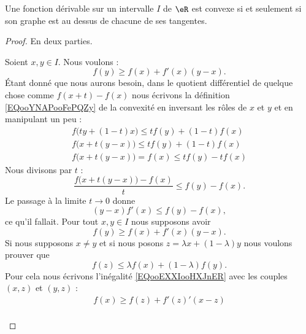 \begin{proposition} \label{PROPooQPOSooDZlUAJ}
	Une fonction dérivable sur un intervalle \( I\) de \( \eR\) est convexe si et seulement si son graphe est au dessus de chacune de ses tangentes.
\end{proposition}

\begin{proof}
	En deux parties.
	\begin{subproof}
		Soient \( x,y\in I\). Nous voulons :
		\begin{equation}
			f(y)\geq f(x)+f'(x)(y-x).
		\end{equation}
		Étant donné que nous aurons besoin, dans le quotient différentiel de quelque chose comme \( f(x+t)-f(x)\) nous écrivons la définition \eqref{EQooYNAPooFePQZy} de la convexité en inversant les rôles de \( x\) et \( y\) et en manipulant un peu :
		\begin{subequations}
			\begin{align}
				f\big( ty+(1-t)x \big)\leq tf(y)+(1-t)f(x) \\
				f\big( x+t(y-x) \big)\leq tf(y)+(1-t)f(x)  \\
				f\big(  x+t(y-x)  \big)=f(x)\leq tf(y)-tf(x)
			\end{align}
		\end{subequations}
		Nous divisons par \( t\) :
		\begin{equation}
			\frac{ f\big( x+t(y-x) \big)-f(x) }{ t }\leq f(y)-f(x).
		\end{equation}
		Le passage à la limite \( t\to 0\) donne
		\begin{equation}
			(y-x)f'(x)\leq f(y)-f(x),
		\end{equation}
		ce qu'il fallait.
		Pour tout \( x,y\in I\) nous supposons avoir
		\begin{equation}        \label{EQooEXXIooHXJnER}
			f(y)\geq f(x)+f'(x)(y-x).
		\end{equation}
		Si nous supposons \( x\neq y\) et si nous posons \( z=\lambda x+(1-\lambda)y\) nous voulons prouver que
		\begin{equation}
			f(z)\leq \lambda f(x)+(1-\lambda)f(y).
		\end{equation}
		Pour cela nous écrivons l'inégalité \eqref{EQooEXXIooHXJnER} avec les couples \( (x,z)\) et \( (y,z)\) :
		\begin{subequations}
			\begin{align}
				f(x)\geq f(z)+f'(z)'(x-z) \\

\end{align}
\end{subequations}
\end{subproof}
\end{proof}
